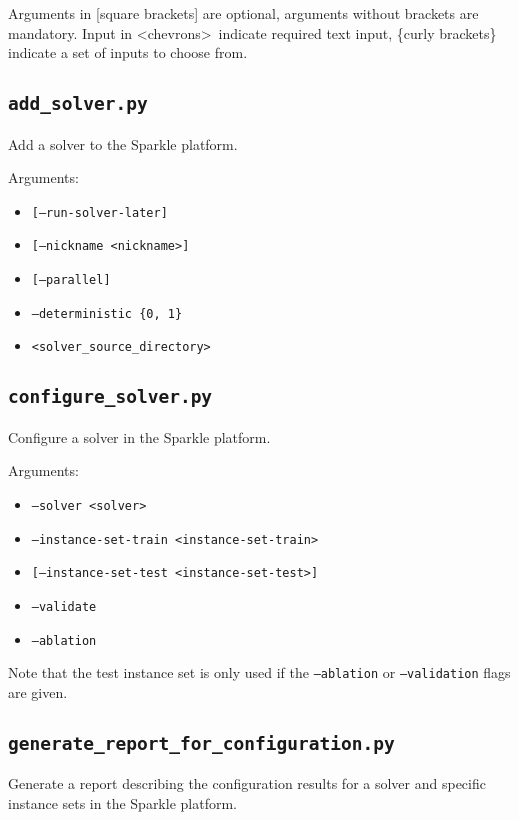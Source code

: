\documentclass{article}
\begin{document}
Arguments in [square brackets] are optional, arguments without brackets are mandatory. Input in \textless chevrons\textgreater~indicate required text input, \{curly brackets\} indicate a set of inputs to choose from.

\subsection{\texttt{add\_solver.py}}
\label{cmd:add_solver}
Add a solver to the Sparkle platform.

Arguments:
\begin{itemize}[noitemsep]
  \item[] \texttt{[--run-solver-later]}
  \item[] \texttt{[--nickname <nickname>]}
  \item[] \texttt{[--parallel]}
  \item[] \texttt{--deterministic \{0, 1\}}
  \item[] \texttt{<solver\_source\_directory>}
\end{itemize}

\subsection{\texttt{configure\_solver.py}}
\label{cmd:configure_solver}
Configure a solver in the Sparkle platform.

Arguments:
\begin{itemize}[noitemsep]
  \item[] \texttt{--solver <solver>}
  \item[] \texttt{--instance-set-train <instance-set-train>}
  \item[] \texttt{[--instance-set-test <instance-set-test>]}
  \item[] \texttt{--validate}
  \item[] \texttt{--ablation}
\end{itemize}

Note that the test instance set is only used if the \texttt{--ablation} or \texttt{--validation} flags are given.

\subsection{\texttt{generate\_report\_for\_configuration.py}}
\label{cmd:generate_report_for_configuration}
Generate a report describing the configuration results for a solver and specific instance sets in the Sparkle platform.
\end{document}
